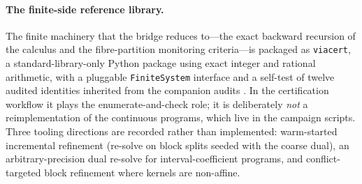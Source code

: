 \paragraph{The finite-side reference library.}
The finite machinery that the bridge reduces to---the exact backward recursion of the calculus and the fibre-partition monitoring criteria---is packaged as \texttt{viacert}, a standard-library-only Python package using exact integer and rational arithmetic, with a pluggable \texttt{FiniteSystem} interface and a self-test of twelve audited identities inherited from the companion audits \cite{Abaee2026calc,Abaee2026worked}. In the certification workflow it plays the enumerate-and-check role; it is deliberately \emph{not} a reimplementation of the continuous programs, which live in the campaign scripts. Three tooling directions are recorded rather than implemented: warm-started incremental refinement (re-solve on block splits seeded with the coarse dual), an arbitrary-precision dual re-solve for interval-coefficient programs, and conflict-targeted block refinement where kernels are non-affine.
